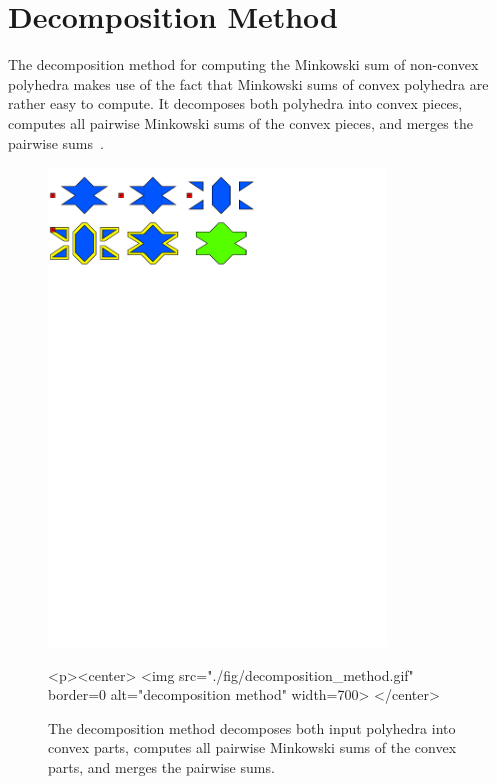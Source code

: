 \section{Decomposition Method}

The decomposition method for computing the Minkowski sum of non-convex
polyhedra makes use of the fact that Minkowski sums of convex
polyhedra are rather easy to compute. It decomposes both polyhedra
into convex pieces, computes all pairwise Minkowski sums of the convex
pieces, and merges the pairwise sums~\cite{bkos-cgaa-97}.

\begin{figure}[t]
  \begin{ccTexOnly}
    \begin{center}
      \includegraphics[width=0.8\textwidth]{Minkowski_sum_3/fig/decomposition_method}
    \end{center}
  \end{ccTexOnly}
  \begin{ccHtmlOnly}
    <p><center>
    <img src="./fig/decomposition_method.gif" border=0
    alt="decomposition method" width=700>
    </center>
  \end{ccHtmlOnly}
  \caption{The decomposition method decomposes both input polyhedra
           into convex parts, computes all pairwise Minkowski sums
           of the convex parts, and merges the pairwise sums.}
\end{figure}

